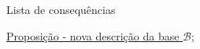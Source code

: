 \begin{titlemize}{Lista de consequências}
	\item \hyperref[pertence-a-base-se-e-somente-se-possui-i-trivial]{Proposição - nova descrição da base $\mathcal{B}$};\\ %
\end{titlemize}

